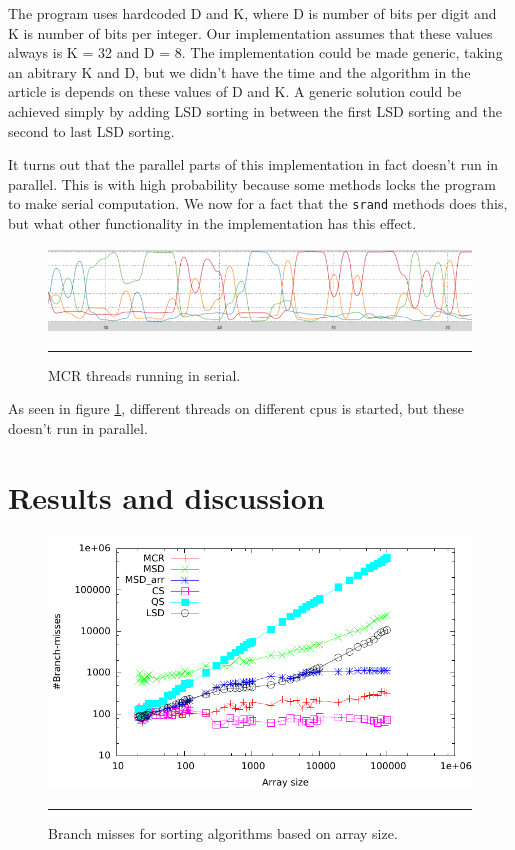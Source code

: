 The program uses hardcoded D and K, where D is number of bits per digit and K is number of bits per integer. Our implementation assumes that these values always is K = 32 and D = 8.
The implementation could be made generic, taking an abitrary K and D, but we didn't have the time and the algorithm in the article is depends on these values of D and K.
A generic solution could be achieved simply by adding LSD sorting in between the first LSD sorting and the second to last LSD sorting.

It turns out that the parallel parts of this implementation in fact doesn't run in parallel. This is with high probability because some methods locks the program to make serial computation.
We now for a fact that the \verb!srand! methods does this, but what other functionality in the implementation has this effect.   

\begin{figure}[htbp]
	\centering
		\includegraphics[width=\textwidth]{./Figures/Project2b/multicore_cpu_usage.png}
		\rule{35em}{0.5pt}
	\caption[Multicore CPU usage]{
	MCR threads running in serial.
	}
	\label{fig:multicore_cpu_usage}
\end{figure}

As seen in figure \ref{fig:multicore_cpu_usage}, different threads on different cpus is started, but these doesn't run in parallel.

\section{Results and discussion}


\begin{figure}[htbp]
	\centering
		\includegraphics[width=\textwidth]{./Figures/Project2b/Branch_misses.pdf}
		\rule{35em}{0.5pt}
	\caption[Branch misses]{
	Branch misses for sorting algorithms based on array size.
	}
	\label{fig:Branch_misses_p2b}
\end{figure}

